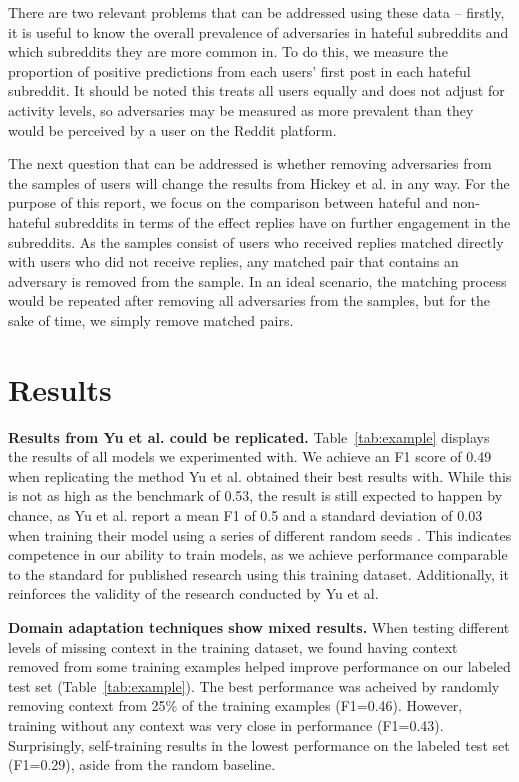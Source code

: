 \documentclass[10pt,twocolumn,letterpaper]{article}
\begin{document}
There are two relevant problems that can be addressed using these data -- firstly, it is useful to know the overall prevalence of adversaries in hateful subreddits and which subreddits they are more common in. To do this, we measure the proportion of positive predictions from each users' first post in each hateful subreddit. It should be noted this treats all users equally and does not adjust for activity levels, so adversaries may be measured as more prevalent than they would be perceived by a user on the Reddit platform.

The next question that can be addressed is whether removing adversaries from the samples of users will change the results from Hickey et al. in any way. For the purpose of this report, we focus on the comparison between hateful and non-hateful subreddits in terms of the effect replies have on further engagement in the subreddits. As the samples consist of users who received replies matched directly with users who did not receive replies, any matched pair that contains an adversary is removed from the sample. In an ideal scenario, the matching process would be repeated after removing all adversaries from the samples, but for the sake of time, we simply remove matched pairs.

\section{Results}

\textbf{Results from Yu et al. could be replicated.} Table~\ref{tab:example} displays the results of all models we experimented with. We achieve an F1 score of 0.49 when replicating the method Yu et al. obtained their best results with. While this is not as high as the benchmark of 0.53, the result is still expected to happen by chance, as Yu et al. report a mean F1 of 0.5 and a standard deviation of 0.03 when training their model using a series of different random seeds \cite{yu-etal-2022-hate}. This indicates competence in our ability to train models, as we achieve performance comparable to the standard for published research using this training dataset. Additionally, it reinforces the validity of the research conducted by Yu et al.

\textbf{Domain adaptation techniques show mixed results.} When testing different levels of missing context in the training dataset, we found having context removed from some training examples helped improve performance on our labeled test set (Table~\ref{tab:example}). The best performance was acheived by randomly removing context from 25\% of the training examples (F1=0.46). However, training without any context was very close in performance (F1=0.43). Surprisingly, self-training results in the lowest performance on the labeled test set (F1=0.29), aside from the random baseline.
\end{document}
